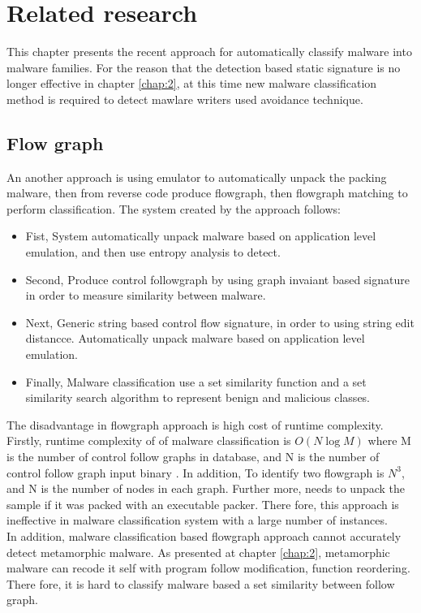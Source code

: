 \chapter{Related research}\label{chap:3}
%
%
This chapter presents the recent approach for automatically classify malware into malware families. For the reason that the detection based static signature is no longer effective in chapter \ref{chap:2}, at this time new malware classification method is required to detect mawlare writers used avoidance technique.


\section{Flow graph}
An another approach is using emulator to automatically unpack the packing malware, then from reverse code produce flowgraph, then flowgraph matching to perform classification\cite{silvio}. The system created by the approach follows:
\begin{itemize}
\item Fist, System automatically unpack malware based on application level emulation, and then use entropy analysis to detect.\\
\item Second, Produce control followgraph by using graph invaiant based signature in order to measure similarity between malware.\\
\item Next, Generic string based control flow signature, in order to using string edit distancce. Automatically unpack malware based on application level emulation.\\
\item Finally, Malware classification use a set similarity function and a set similarity search algorithm to represent benign and malicious classes.\\
\end{itemize}
The disadvantage in flowgraph approach is high cost of runtime complexity. Firstly, runtime complexity of of malware classification is $O(N\log{M})$ where M is the number of control follow graphs in database, and N is the number of control follow graph input binary \cite{silvio}. In addition, To identify two flowgraph is $N^{3}$, and N is the number of nodes in each graph. Further more, needs to unpack the sample if it was packed with an executable packer. There fore, this approach is ineffective in malware classification system with a large number of instances.\\
In addition, malware classification based flowgraph approach cannot accurately detect metamorphic malware. As presented at chapter \ref{chap:2}, metamorphic malware can recode it self with program follow modification, function reordering. There fore, it is hard to classify malware based a set  similarity between follow graph.\\ 
